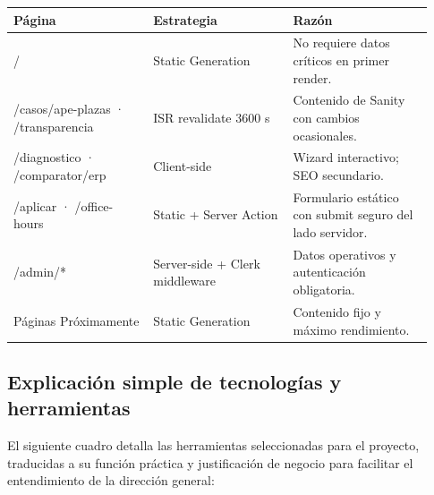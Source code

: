 \documentclass[11pt,letterpaper]{article}
\begin{document}
\begin{longtable}{p{0.31\linewidth}p{0.31\linewidth}p{0.31\linewidth}}
\toprule
\textbf{Página} & \textbf{Estrategia} & \textbf{Razón} \\
\midrule
/ & Static Generation & No requiere datos críticos en primer render. \\
/casos/ape-plazas · /transparencia & ISR revalidate 3600 s & Contenido de Sanity con cambios ocasionales. \\
/diagnostico · /comparator/erp & Client-side & Wizard interactivo; SEO secundario. \\
/aplicar · /office-hours & Static + Server Action & Formulario estático con submit seguro del lado servidor. \\
/admin/* & Server-side + Clerk middleware & Datos operativos y autenticación obligatoria. \\
Páginas Próximamente & Static Generation & Contenido fijo y máximo rendimiento. \\
\bottomrule
\end{longtable}

\subsection{Explicación simple de tecnologías y herramientas}

El siguiente cuadro detalla las herramientas seleccionadas para el proyecto, traducidas a su función práctica y justificación de negocio para facilitar el entendimiento de la dirección general:
\end{document}
